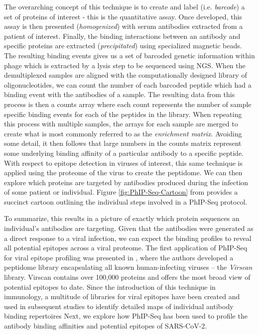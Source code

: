 \documentclass{article}
\begin{document}
The overarching concept of this technique is to create and label (i.e. \textit{barcode}) a set of proteins of interest - this is the quantitative assay.
Once developed, this assay is then presented (\textit{homogenized}) with serum antibodies extracted from a patient of interest.
Finally, the binding interactions between an antibody and specific proteins are extracted (\textit{precipitated}) using specialized magnetic beads.
The resulting binding events gives us a set of barcoded genetic information within phage which is extracted by a lysis step to be sequenced using NGS.
When the demultiplexed samples are aligned with the computationally designed library of oligonucleotides, we can count the number of each barcoded peptide which had a binding event with the antibodies of a sample.
The resulting data from this process is then a counts array where each count represents the number of sample specific binding events for each of the peptides in the library.
When repeating this process with multiple samples, the arrays for each sample are merged to create what is most commonly referred to as the \textit{enrichment matrix}.
Avoiding some detail, it then follows that large numbers in the counts matrix represent some underlying binding affinity of a particular antibody to a specific peptide.
With respect to epitope detection in viruses of interest, this same technique is applied using the proteome of the virus to create the peptidome.
We can then explore which proteins are targeted by antibodies produced during the infection of some patient or individual.
Figure \ref{fig:PhIP-Seq-Cartoon} from \citet{Mohan2018} provides a succinct cartoon outlining the individual steps involved in a PhIP-Seq protocol.

To summarize, this results in a picture of exactly which protein sequences an individual's antibodies are targeting.
Given that the antibodies were generated as a direct response to a viral infection, we can expect the binding profiles to reveal all potential epitopes across a viral proteome.
The first application of PhIP-Seq for viral epitope profiling was presented in \citet{Xu2015}, where the authors developed a peptidome library encapsulating all known human-infecting viruses -- the \textit{Virscan} library.
Virscan contains over 100,000 proteins and offers the most broad view of potential epitopes to date.
Since the introduction of this technique in immunology, a multitude of libraries for viral epitopes have been created and used in subsequent studies to identify detailed maps of individual antibody binding repertoires 
Next, we explore how PhIP-Seq has been used to profile the antibody binding affinities and potential epitopes of SARS-CoV-2.
\end{document}
